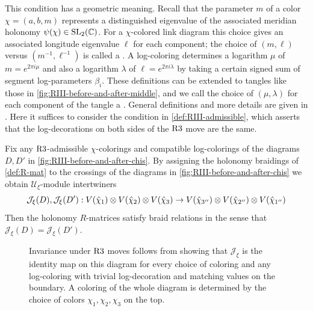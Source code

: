 \documentclass{sl2ams}
\numberwithin{equation}{section}
\newcommand{\J}{\mathcal{J}}
\newcommand{\U}{\mathcal{U}}
\begin{document}
This condition has a geometric meaning.
Recall that the parameter \(m\) of a color \(\chi = (a, b, m)\) represents a distinguished eigenvalue of the associated meridian holonomy \(\psi(\chi) \in \operatorname{SL}_2(\mathbb{C})\).
For a \(\chi\)-colored link diagram this choice gives an associated longitude eigenvalue \(\ell\) \cite{McPhailSnyder2022} for each component; the choice of \((m, \ell)\) versus \((m^{-1}, \ell^{-1})\) is called a .
A log-coloring determines a logarithm \(\mu\) of \(m = e^{2\pi i \mu}\) and also a logarithm \(\lambda\) of \(\ell  = e^{2 \pi i \lambda}\) by taking a certain signed sum of segment log-parameters \(\beta_{i}\).
These definitions can be extended to tangles like those in \cref{fig:RIII-before-and-after-middle}, and we call the choice of \((\mu, \lambda)\) for each component of the tangle a .
General definitions and more details are given in \cite{McPhailSnyderVolume}.
Here it suffices to consider the condition in \cref{def:RIII-admissible}, which asserts that the log-decorations on both sides of the \(\operatorname{R3}\) move are the same.

\begin{theorem}
  \label{thm:RIII}
  Fix any \(\operatorname{R3}\)-admissible \(\chi\)-colorings and compatible log-colorings of the diagrams \(D, D'\) in \cref{fig:RIII-before-and-after-chis}.
  By assigning the holonomy braidings of \cref{def:R-mat} to the crossings of the diagrams in \cref{fig:RIII-before-and-after-chis} we obtain \(\U_{\xi}\)-module intertwiners
  \[
    \J_{\xi}(D)
    ,
    \J_{\xi}(D')
    :
    \rep{\hat{\chi}_{1}}
    \otimes
    \rep{\hat{\chi}_{2}}
    \otimes
    \rep{\hat{\chi}_{3}}
    \to
    \rep{\hat{\chi}_{3''}}
    \otimes
    \rep{\hat{\chi}_{2''}}
    \otimes
    \rep{\hat{\chi}_{1''}}
  \]
  Then the holonomy \(R\)-matrices satisfy braid relations in the sense that \(\J_{\xi}(D) = \J_{\xi}(D')\).
\end{theorem}

\begin{figure}
  \centering
  
  \caption{
    Invariance under \(\operatorname{R3}\) moves follows from showing that \(\J_{\xi}\) is the identity map on this diagram for every choice of coloring and any log-coloring with trivial log-decoration and matching values on the boundary.
    A coloring of the whole diagram is determined by the choice of colors \(\chi_1, \chi_2, \chi_3\) on the top.
  }
  \label{fig:RIII-colored-together}
\end{figure}
\end{document}
